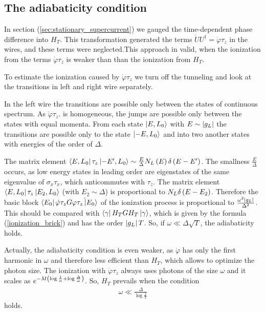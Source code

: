 \subsection{The adiabaticity condition}
\label{subsec: adiabaticity condition}

In section (\ref{sec:stationary_supercurrent}) we gauged the time-dependent phase difference into $ H_T $. This transformation generated the terms $ \dot{U}U^\dagger=\dot{\varphi}\tau_z $ in the wires, and these terms were neglected.This approach in valid, when the ionization from the terms $  \dot{\varphi}\tau_z $ is weaker than than the ionization from $ H_T$.

To estimate the ionization caused by $ \dot{\varphi}\tau_z $ we turn off the tunneling  and look at the transitions in left and right wire separately.

In the left wire the transitions are possible only between the states of continuous spectrum. As $ \dot{\varphi}\tau_z. $ is homogeneous, the jumps are possible only between the states with equal momenta. From each state $ \ket{E,L_0} $ with $ E\sim\left|g_L\right| $ the transitions are possible only to the state $ \ket{-E,L_0} $ and into two another states with energies of the order of $ \Delta $.

  The matrix element $ \bra{E,L_0}\tau_z\ket{-E', L_0} \sim\frac{E}{\Delta}
  N_L\left(E\right)\delta\left(E-E'\right)$. The smallness $ \frac{E}{\Delta} $ occurs, as low energy states in leading order are eigenstates  of the same eigenvalue of $ \sigma_x\tau_x $, which anticommutes with $ \tau_z $. The matrix element $ \bra{E,L_0}\tau_z\ket{E_2, L_0}$ (with $ E_2\sim \Delta $) is proportional to $ N_L \delta\left(E-E_2\right) $. Therefore the basic block $ \bra{E_0}\dot{\varphi}\tau_zG\dot{\varphi\tau_z\ket{E_0}}$ of the ionization process is proportional to $ \frac{\omega^2\left|g_L\right|}{\Delta^2} $. This should be compared with $ \bra{\gamma}H_T G H_T \ket{\gamma}$, which is given by the formula (\ref{ionization_brick}) and has the order $ \left|g_L\right|T $. So, if $ \omega\ll\Delta\sqrt{T} $, the adiabaticity holds.
  
  Actually, the adiabaticity condition is even weaker, as $ \dot{\varphi} $ has only the first harmonic in $ \omega $  and therefore less efficient than $ H_T $, which allows to optimize the photon size. The ionization with $ \dot{\varphi}\tau_z $ always uses photons of the size $ \omega $ and it scales as $ e^{-M\left(\log\frac{1}{\alpha}+\log\frac{\Delta}{\omega}\right)} $. So, $ H_T $ prevails when the condition
  \begin{gather}
  \omega
  	\ll \frac{\Delta}{\log\frac{1}{T}}
  \end{gather}
  holds.
  
